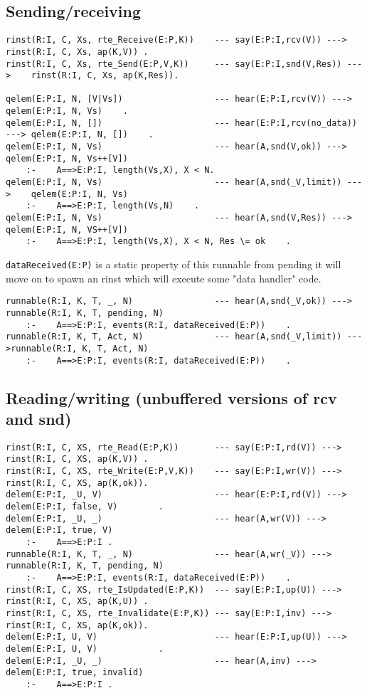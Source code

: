 \subsection{Sending/receiving}

\begin{verbatim}
rinst(R:I, C, Xs, rte_Receive(E:P,K))    --- say(E:P:I,rcv(V)) --->        rinst(R:I, C, Xs, ap(K,V)) .
rinst(R:I, C, Xs, rte_Send(E:P,V,K))     --- say(E:P:I,snd(V,Res)) --->    rinst(R:I, C, Xs, ap(K,Res)).

qelem(E:P:I, N, [V|Vs])                  --- hear(E:P:I,rcv(V)) --->       qelem(E:P:I, N, Vs)    .
qelem(E:P:I, N, [])                      --- hear(E:P:I,rcv(no_data)) ---> qelem(E:P:I, N, [])    .
qelem(E:P:I, N, Vs)                      --- hear(A,snd(V,ok)) --->        qelem(E:P:I, N, Vs++[V])
    :-    A==>E:P:I, length(Vs,X), X < N.
qelem(E:P:I, N, Vs)                      --- hear(A,snd(_V,limit)) --->    qelem(E:P:I, N, Vs)
    :-    A==>E:P:I, length(Vs,N)    .
qelem(E:P:I, N, Vs)                      --- hear(A,snd(V,Res)) --->       qelem(E:P:I, N, VS++[V])
    :-    A==>E:P:I, length(Vs,X), X < N, Res \= ok    .
\end{verbatim}

\verb+dataReceived(E:P)+ is a static property of this runnable
  from pending it will move on to spawn an rinst which will execute some "data handler" code.
\begin{verbatim}
runnable(R:I, K, T, _, N)                --- hear(A,snd(_V,ok)) --->   runnable(R:I, K, T, pending, N)
    :-    A==>E:P:I, events(R:I, dataReceived(E:P))    .
runnable(R:I, K, T, Act, N)              --- hear(A,snd(_V,limit)) --->runnable(R:I, K, T, Act, N)
    :-    A==>E:P:I, events(R:I, dataReceived(E:P))    .
\end{verbatim}

\subsection{Reading/writing (unbuffered versions of rcv and snd)}

\begin{verbatim}
rinst(R:I, C, XS, rte_Read(E:P,K))       --- say(E:P:I,rd(V)) --->     rinst(R:I, C, XS, ap(K,V)) .
rinst(R:I, C, XS, rte_Write(E:P,V,K))    --- say(E:P:I,wr(V)) --->     rinst(R:I, C, XS, ap(K,ok)).
delem(E:P:I, _U, V)                      --- hear(E:P:I,rd(V)) --->    delem(E:P:I, false, V)        .
delem(E:P:I, _U, _)                      --- hear(A,wr(V)) --->        delem(E:P:I, true, V)
    :-    A==>E:P:I .
runnable(R:I, K, T, _, N)                --- hear(A,wr(_V)) --->       runnable(R:I, K, T, pending, N)
    :-    A==>E:P:I, events(R:I, dataReceived(E:P))    .
rinst(R:I, C, XS, rte_IsUpdated(E:P,K))  --- say(E:P:I,up(U)) --->     rinst(R:I, C, XS, ap(K,U)) .
rinst(R:I, C, XS, rte_Invalidate(E:P,K)) --- say(E:P:I,inv) --->       rinst(R:I, C, XS, ap(K,ok)).
delem(E:P:I, U, V)                       --- hear(E:P:I,up(U)) --->    delem(E:P:I, U, V)            .
delem(E:P:I, _U, _)                      --- hear(A,inv) --->          delem(E:P:I, true, invalid)
    :-    A==>E:P:I .
\end{verbatim}

